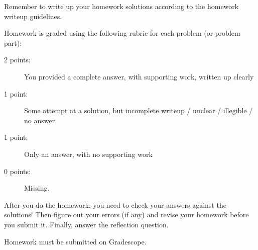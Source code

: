 \documentclass[11pt, oneside]{article}   	%
\begin{document}
Remember to write up your homework solutions according to the homework writeup guidelines. 

Homework is graded using the following rubric for each problem (or problem part):

\begin{description}
\item[2 points:] You provided a complete answer, with supporting work, written up clearly
\item[1 point:] Some attempt at a solution, but incomplete writeup / unclear / illegible / no answer
\item[1 point:] Only an answer, with no supporting work 
\item[0 points:] Missing.
\end{description}

After you do the homework, you need to check your answers against the solutions! Then figure out your errors (if any) and revise your homework before you submit it. Finally, answer the reflection question.

Homework must be submitted on Gradescope.
\end{document}

